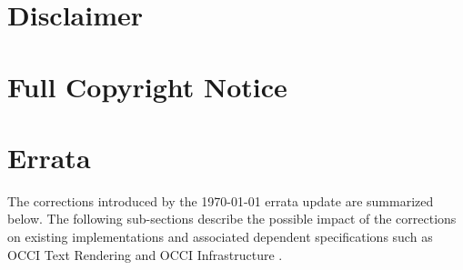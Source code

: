 \documentclass[10pt,a4paper]{article}
\begin{document}
\section{Disclaimer}


\section{Full Copyright Notice}





\appendix

\newpage
\section{Errata}
\label{sec:errata}

The corrections introduced by the {\today} errata update are summarized below.
The following sub-sections describe the possible impact of the corrections
on existing implementations and associated dependent specifications such
as OCCI Text Rendering \cite{occi:text} and OCCI Infrastructure
\cite{occi:infrastructure}.
\end{document}
